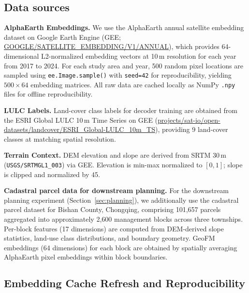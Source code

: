 \documentclass{article}
\begin{document}
\subsection{Data sources}

\textbf{AlphaEarth Embeddings.} We use the AlphaEarth annual satellite embedding dataset on Google Earth Engine (GEE; \url{GOOGLE/SATELLITE_EMBEDDING/V1/ANNUAL}), which provides 64-dimensional L2-normalized embedding vectors at 10\,m resolution for each year from 2017 to 2024. For each study area and year, 500 random pixel locations are sampled using \texttt{ee.Image.sample()} with \texttt{seed=42} for reproducibility, yielding $500\times64$ embedding matrices. All raw data are cached locally as NumPy \texttt{.npy} files for offline reproducibility.

\textbf{LULC Labels.} Land-cover class labels for decoder training are obtained from the ESRI Global LULC 10\,m Time Series on GEE (\url{projects/sat-io/open-datasets/landcover/ESRI_Global-LULC_10m_TS}), providing 9 land-cover classes at matching spatial resolution.

\textbf{Terrain Context.} DEM elevation and slope are derived from SRTM 30\,m (\texttt{USGS/SRTMGL1\_003}) via GEE. Elevation is min-max normalized to $[0,1]$; slope is clipped and normalized by 45\textdegree.

\textbf{Cadastral parcel data for downstream planning.} For the downstream planning experiment (Section~\ref{sec:planning}), we additionally use the cadastral parcel dataset for Bishan County, Chongqing, comprising 101{,}657 parcels aggregated into approximately 2{,}600 management blocks across three townships. Per-block features (17 dimensions) are computed from DEM-derived slope statistics, land-use class distributions, and boundary geometry. GeoFM embeddings (64 dimensions) for each block are obtained by spatially averaging AlphaEarth pixel embeddings within block boundaries.

\subsection{Embedding Cache Refresh and Reproducibility}
\label{sec:data_refresh}

\noindent{}
\end{document}
